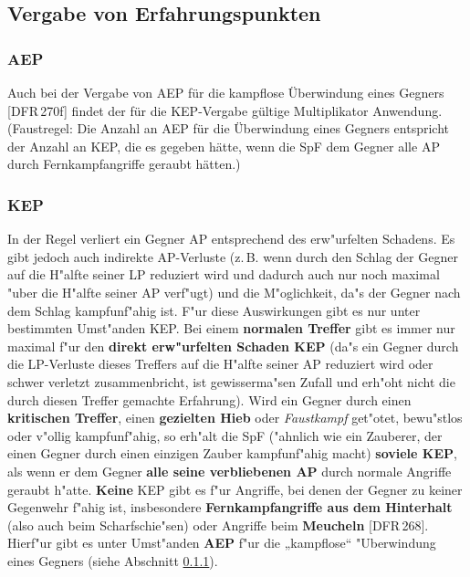 \documentclass[10pt,a4paper,germanpar]{article}
\begin{document}
\subsection{Vergabe von Erfahrungspunkten}

\subsubsection{AEP}
\label{aep}

Auch bei der Vergabe von AEP für die kampflose Überwindung eines
Gegners [DFR\,270f] findet der für die KEP-Vergabe gültige
Multiplikator Anwendung. (Faustregel: Die Anzahl an AEP für die
Überwindung eines Gegners entspricht der Anzahl an KEP, die es gegeben
hätte, wenn die SpF dem Gegner alle AP durch Fernkampfangriffe
geraubt hätten.)

\subsubsection{KEP}

In der Regel verliert ein Gegner AP entsprechend des erw"urfelten
Schadens. Es gibt jedoch auch indirekte AP-Verluste (z.\,B. wenn durch
den Schlag der Gegner auf die H"alfte seiner LP reduziert wird und
dadurch auch nur noch maximal "uber die H"alfte seiner AP verf"ugt)
und die M"oglichkeit, da"s der Gegner nach dem Schlag kampfunf"ahig
ist. F"ur diese Auswirkungen gibt es nur unter bestimmten Umst"anden
KEP. Bei einem \textbf{normalen Treffer} gibt es immer nur maximal
f"ur den \textbf{direkt erw"urfelten Schaden KEP} (da"s ein Gegner
durch die LP-Verluste dieses Treffers auf die H"alfte seiner AP
reduziert wird oder schwer verletzt zusammenbricht, ist gewisserma"sen
Zufall und erh"oht nicht die durch diesen Treffer gemachte Erfahrung).
Wird ein Gegner durch einen \textbf{kritischen Treffer}, einen
\textbf{gezielten Hieb} oder \emph{Faustkampf} get"otet, bewu"stlos
oder v"ollig kampfunf"ahig, so erh"alt die SpF ("ahnlich wie ein
Zauberer, der einen Gegner durch einen einzigen Zauber kampfunf"ahig
macht) \textbf{soviele KEP}, als wenn er dem Gegner \textbf{alle seine
  verbliebenen AP} durch normale Angriffe geraubt h"atte.
\textbf{Keine} KEP gibt es f"ur Angriffe, bei denen der Gegner zu
keiner Gegenwehr f"ahig ist, insbesondere \textbf{Fernkampfangriffe
  aus dem Hinterhalt} (also auch beim Scharfschie"sen) oder Angriffe
beim \textbf{Meucheln} [DFR\,268]. Hierf"ur gibt es unter Umst"anden
\textbf{AEP} f"ur die „kampflose“ "Uberwindung eines Gegners (siehe
Abschnitt \ref{aep}).
\end{document}
